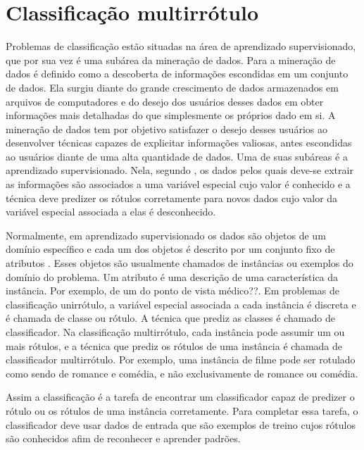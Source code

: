 \chapter{Classificação multirrótulo}

Problemas de classificação estão situadas na área de aprendizado supervisionado, que por sua vez é uma 
subárea da mineração de dados. Para \cite{dunham2003introductory} a mineração de dados é definido como a descoberta
de informações escondidas em um conjunto de dados. Ela surgiu diante do grande crescimento de dados armazenados
em arquivos de computadores e do desejo dos usuários desses dados em obter informações mais detalhadas do que simplesmente
os próprios dado em si. A mineração de dados tem por objetivo satisfazer o desejo desses usuários ao desenvolver técnicas
capazes de explicitar informações valiosas, antes escondidas ao usuários diante de uma alta quantidade de dados.
Uma de suas subáreas é a aprendizado supervisionado. Nela, segundo \cite{mohri2012foundations},
os dados pelos quais deve-se extrair as informações são associados a uma variável especial cujo valor
é conhecido e a técnica deve predizer os rótulos
corretamente para novos dados cujo valor da variável especial associada a elas é desconhecido.

Normalmente, em aprendizado supervisionado os dados são objetos de um domínio específico e cada um dos objetos
é descrito por um conjunto fixo de atributos \cite{rezende2003sistemas}. 
Esses objetos são usualmente chamados de instâncias ou exemplos do domínio do problema.
Um atributo é uma descrição de uma característica da instância.
Por exemplo, de um do ponto de vista médico??.
Em problemas de classificação unirrótulo, a variável especial associada a cada instância é discreta
e é chamada de classe ou rótulo. A técnica que prediz as classes é chamado de classificador.
Na classificação multirrótulo, cada instância pode assumir um ou mais rótulos, e a técnica
que prediz os rótulos de uma instância é chamada de classificador multirrótulo.
Por exemplo, uma instância de filme pode ser rotulado como sendo de romance e comédia, 
e não exclusivamente de romance ou comédia.

Assim a classificação é a tarefa de encontrar um classificador capaz de predizer 
o rótulo ou os rótulos de uma instância corretamente.
Para completar essa tarefa, o classificador deve usar dados de entrada que são exemplos
de treino cujos rótulos são conhecidos afim de
reconhecer e aprender padrões.

